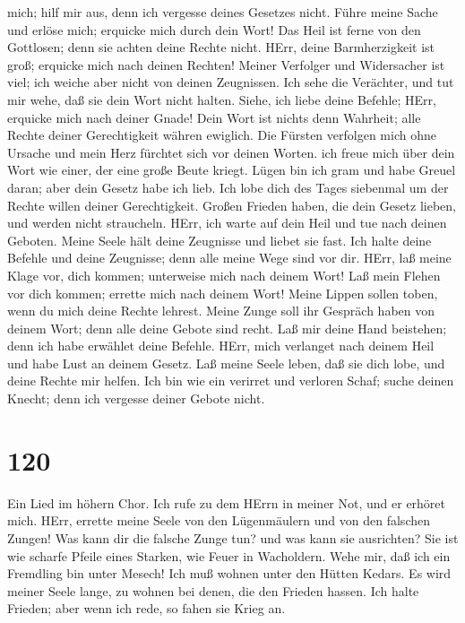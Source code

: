 mich; hilf mir aus, denn ich vergesse deines Gesetzes nicht.
 Führe meine Sache und erlöse mich; erquicke mich durch
dein Wort!  Das Heil ist ferne von den Gottlosen; denn sie
achten deine Rechte nicht.  HErr, deine Barmherzigkeit ist
groß; erquicke mich nach deinen Rechten!  Meiner Verfolger
und Widersacher ist viel; ich weiche aber nicht von deinen Zeugnissen.
 Ich sehe die Verächter, und tut mir wehe, daß sie dein
Wort nicht halten.  Siehe, ich liebe deine Befehle; HErr,
erquicke mich nach deiner Gnade!  Dein Wort ist nichts
denn Wahrheit; alle Rechte deiner Gerechtigkeit währen ewiglich.
 Die Fürsten verfolgen mich ohne Ursache und mein Herz
fürchtet sich vor deinen Worten.  ich freue mich über dein
Wort wie einer, der eine große Beute kriegt.  Lügen bin
ich gram und habe Greuel daran; aber dein Gesetz habe ich lieb.
 Ich lobe dich des Tages siebenmal um der Rechte willen
deiner Gerechtigkeit.  Großen Frieden haben, die dein
Gesetz lieben, und werden nicht straucheln.  HErr, ich
warte auf dein Heil und tue nach deinen Geboten.  Meine
Seele hält deine Zeugnisse und liebet sie fast.  Ich halte
deine Befehle und deine Zeugnisse; denn alle meine Wege sind vor dir.
 HErr, laß meine Klage vor, dich kommen; unterweise mich
nach deinem Wort!  Laß mein Flehen vor dich kommen;
errette mich nach deinem Wort!  Meine Lippen sollen toben,
wenn du mich deine Rechte lehrest.  Meine Zunge soll ihr
Gespräch haben von deinem Wort; denn alle deine Gebote sind recht.
 Laß mir deine Hand beistehen; denn ich habe erwählet
deine Befehle.  HErr, mich verlanget nach deinem Heil und
habe Lust an deinem Gesetz.  Laß meine Seele leben, daß
sie dich lobe, und deine Rechte mir helfen.  Ich bin wie
ein verirret und verloren Schaf; suche deinen Knecht; denn ich vergesse
deiner Gebote nicht.

\hypertarget{section-119}{%
\section{120}\label{section-119}}

 Ein Lied im höhern Chor. Ich rufe zu dem HErrn in meiner
Not, und er erhöret mich.  HErr, errette meine Seele von den
Lügenmäulern und von den falschen Zungen!  Was kann dir die
falsche Zunge tun? und was kann sie ausrichten?  Sie ist wie
scharfe Pfeile eines Starken, wie Feuer in Wacholdern.  Wehe
mir, daß ich ein Fremdling bin unter Mesech! Ich muß wohnen unter den
Hütten Kedars.  Es wird meiner Seele lange, zu wohnen bei
denen, die den Frieden hassen.  Ich halte Frieden; aber wenn
ich rede, so fahen sie Krieg an.

